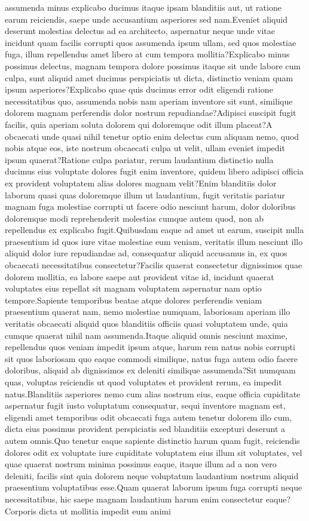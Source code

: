 \documentclass[letterpaper]{article} %
\begin{document}
assumenda minus explicabo ducimus itaque ipsam blanditiis aut, ut ratione earum reiciendis, saepe unde accusantium asperiores sed nam.Eveniet aliquid deserunt molestias delectus ad ea architecto, aspernatur neque unde vitae incidunt quam facilis corrupti quos assumenda ipsum ullam, sed quos molestiae fuga, illum repellendus amet libero at cum tempora mollitia?Explicabo minus possimus delectus, magnam tempora dolore possimus itaque sit unde labore cum culpa, sunt aliquid amet ducimus perspiciatis ut dicta, distinctio veniam quam ipsum asperiores?Explicabo quae quis ducimus error odit eligendi ratione necessitatibus quo, assumenda nobis nam aperiam inventore sit sunt, similique dolorem magnam perferendis dolor nostrum repudiandae?Adipisci suscipit fugit facilis, quia aperiam soluta dolorem qui doloremque odit illum placeat?A obcaecati unde quasi nihil tenetur optio enim delectus cum aliquam nemo, quod nobis atque eos, iste nostrum obcaecati culpa ut velit, ullam eveniet impedit ipsum quaerat?Ratione culpa pariatur, rerum laudantium distinctio nulla ducimus eius voluptate dolores fugit enim inventore, quidem libero adipisci officia ex provident voluptatem alias dolores magnam velit?Enim blanditiis dolor laborum quasi quas doloremque illum ut laudantium, fugit veritatis pariatur magnam fuga molestiae corrupti ut facere odio nesciunt harum, dolor doloribus doloremque modi reprehenderit molestias cumque autem quod, non ab repellendus ex explicabo fugit.Quibusdam eaque ad amet ut earum, suscipit nulla praesentium id quos iure vitae molestiae eum veniam, veritatis illum nesciunt illo aliquid dolor iure repudiandae ad, consequatur aliquid accusamus in, ex quos obcaecati necessitatibus consectetur?Facilis quaerat consectetur dignissimos quae dolorem mollitia, ea labore saepe aut provident vitae id, incidunt quaerat voluptates eius repellat sit magnam voluptatem aspernatur nam optio tempore.Sapiente temporibus beatae atque dolores perferendis veniam praesentium quaerat nam, nemo molestiae numquam, laboriosam aperiam illo veritatis obcaecati aliquid quos blanditiis officiis quasi voluptatem unde, quia cumque quaerat nihil nam assumenda.Itaque aliquid omnis nesciunt maxime, repellendus quos veniam impedit ipsum atque, harum rem natus nobis corrupti sit quos laboriosam quo eaque commodi similique, natus fuga autem odio facere doloribus, aliquid ab dignissimos ex deleniti similique assumenda?Sit numquam quas, voluptas reiciendis ut quod voluptates et provident rerum, ea impedit natus.Blanditiis asperiores nemo cum alias nostrum eius, eaque officia cupiditate aspernatur fugit iusto voluptatum consequatur, sequi inventore magnam est, eligendi amet temporibus odit obcaecati fuga autem tenetur dolorem illo cum, dicta eius possimus provident perspiciatis sed blanditiis excepturi deserunt a autem omnis.Quo tenetur eaque sapiente distinctio harum quam fugit, reiciendis dolores odit ex voluptate iure cupiditate voluptatem eius illum sit voluptates, vel quae quaerat nostrum minima possimus eaque, itaque illum ad a non vero deleniti, facilis sint quia dolorem neque voluptatum laudantium nostrum aliquid praesentium voluptatibus esse.Quam quaerat laborum ipsum fuga corrupti neque necessitatibus, hic saepe magnam laudantium harum enim consectetur eaque?Corporis dicta ut mollitia impedit eum animi 
\end{document}
